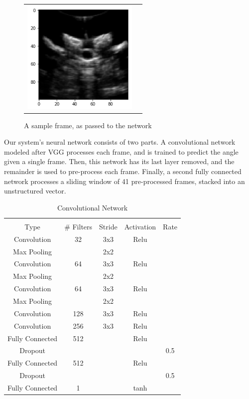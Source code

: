 \documentclass{article}
\begin{document}
\begin{figure}
\centering
\begin{tabular}{cc}
\centering
\includegraphics[height=5.5cm,keepaspectratio]{SampleInput}
\end{tabular}
\caption{A sample frame, as passed to the network
}
\end{figure}


Our system's neural network consists of two parts. A convolutional network modeled after VGG processes each frame, and is trained to predict the angle given a single frame. Then, this network has its last layer removed, and the remainder is used to pre-process each frame. Finally, a second fully connected network processes a sliding window of 41 pre-processed frames, stacked into an unstructured vector.

\begin{table}[ht]
\caption{Convolutional Network}
\begin{tabular}{c c c c c}
\hline \\
Type & \# Filters & Stride & Activation & Rate \\
\hline
Convolution & 32 & 3x3 & Relu \\
Max Pooling &    & 2x2 &      \\
Convolution & 64 & 3x3 & Relu \\
Max Pooling &    & 2x2 &      \\
Convolution & 64 & 3x3 & Relu \\
Max Pooling &    & 2x2 &      \\
Convolution &128 & 3x3 & Relu \\
Convolution &256 & 3x3 & Relu \\
Fully Connected & 512 & & Relu \\
Dropout & & & & 0.5 \\
Fully Connected & 512 & & Relu \\
Dropout & & & & 0.5 \\
Fully Connected & 1 & & tanh \\
\end{tabular}
\end{table}
\end{document}
